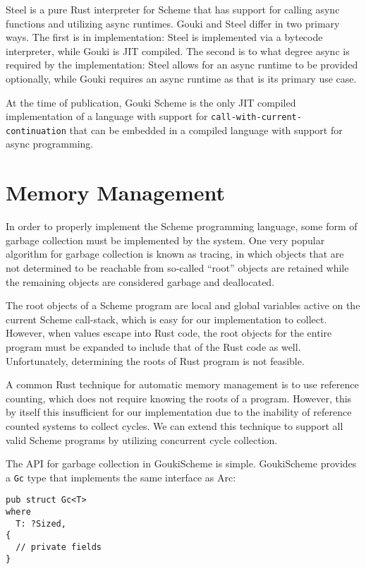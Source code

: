 \documentclass[sigplan,authordraft]{acmart}
\begin{document}
Steel\cite{steel} is a pure Rust interpreter for Scheme that has support for
calling async functions and utilizing async runtimes. Gouki and Steel differ in
two primary ways. The first is in implementation: Steel is implemented via a
bytecode interpreter, while Gouki is JIT compiled. The second is to what degree
async is required by the implementation: Steel allows for an async runtime to
be provided optionally, while Gouki requires an async runtime as that is its
primary use case.

At the time of publication, Gouki Scheme is the only JIT compiled implementation
of a language with support for \texttt{call-with-current-continuation} that can
be embedded in a compiled language with support for async programming.

\section{Memory Management}

In order to properly implement the Scheme programming language, some form of
garbage collection must be implemented by the system. One very popular algorithm
for garbage collection is known as tracing, in which objects that are not
determined to be reachable from so-called ``root'' objects are retained while 
the remaining objects are considered garbage and deallocated\cite{lisptracing}.

The root objects of a Scheme program are local and global variables active on the
current Scheme call-stack, which is easy for our implementation to collect.
However, when values escape into Rust code, the root objects for the entire
program must be expanded to include that of the Rust code as well. Unfortunately,
determining the roots of Rust program is not feasible\cite{rusttracing}.

A common Rust technique for automatic memory management is to use reference
counting, which does not require knowing the roots of a program. However, this
by itself this insufficient for our implementation due to the inability of
reference counted systems to collect cycles\cite{rc}. We can extend this
technique to support all valid Scheme programs by utilizing concurrent cycle
collection\cite{cc}.

The API for garbage collection in GoukiScheme is simple. GoukiScheme provides a
\texttt{Gc} type that implements the same interface as Arc:

\begin{verbatim}
pub struct Gc<T>
where
  T: ?Sized,
{
  // private fields
}
\end{verbatim}
\end{document}
